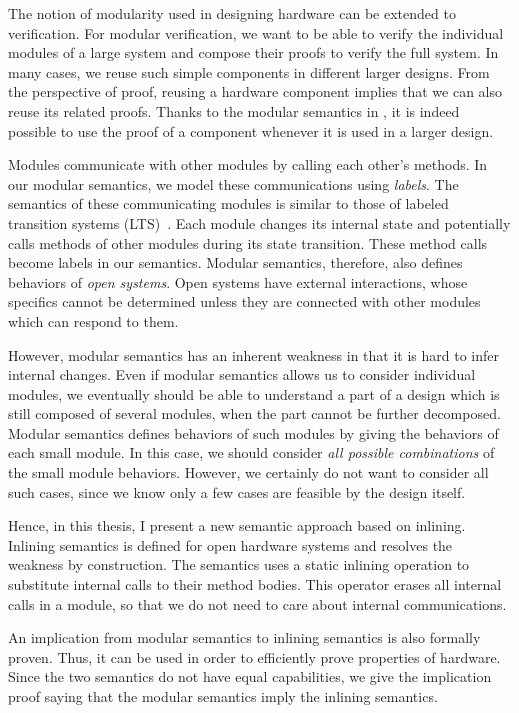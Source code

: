 The notion of modularity used in designing hardware can be extended to
verification. For modular verification, we want to be able to verify
the individual modules of a large system and compose their proofs to
verify the full system. In many cases, we reuse such simple components
in different larger designs. From the perspective of proof, reusing a
hardware component implies that we can also reuse its related
proofs. Thanks to the modular semantics in \Kami{}, it is indeed
possible to use the proof of a component whenever it is used in a
larger design.

Modules communicate with other modules by calling each other's
methods. In our modular semantics, we model these communications using
\emph{labels}. The semantics of these communicating modules is similar
to those of labeled transition systems (LTS)~\cite{lts}. Each module
changes its internal state and potentially calls methods of other
modules during its state transition. These method calls become labels
in our semantics. Modular semantics, therefore, also defines behaviors
of \emph{open systems}. Open systems have external interactions, whose
specifics cannot be determined unless they are connected with other
modules which can respond to them.

However, modular semantics has an inherent weakness in that it is hard
to infer internal changes. Even if modular semantics allows us to
consider individual modules, we eventually should be able to
understand a part of a design which is still composed of several
modules, when the part cannot be further decomposed. Modular semantics
defines behaviors of such modules by giving the behaviors of each
small module. In this case, we should consider \emph{all possible
  combinations} of the small module behaviors. However, we certainly
do not want to consider all such cases, since we know only a few cases
are feasible by the design itself.

Hence, in this thesis, I present a new semantic approach based on
inlining. Inlining semantics is defined for open hardware systems and
resolves the weakness by construction. The semantics uses a static
inlining operation to substitute internal calls to their method
bodies. This operator erases all internal calls in a module, so that
we do not need to care about internal communications.

An implication from modular semantics to inlining semantics is also
formally proven. Thus, it can be used in order to efficiently prove
properties of hardware. Since the two semantics do not have equal
capabilities, we give the implication proof saying that the modular
semantics imply the inlining semantics.

